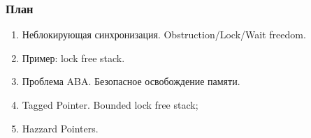 \begin{frame}
\frametitle{План}

\begin{enumerate}
  \item Неблокирующая синхронизация. Obstruction/Lock/Wait freedom.
  \item Пример: lock free stack.
  \item Проблема ABA. Безопасное освобождение памяти.
  \item Tagged Pointer. Bounded lock free stack;
  \item Hazzard Pointers.
\end{enumerate}
\end{frame}
